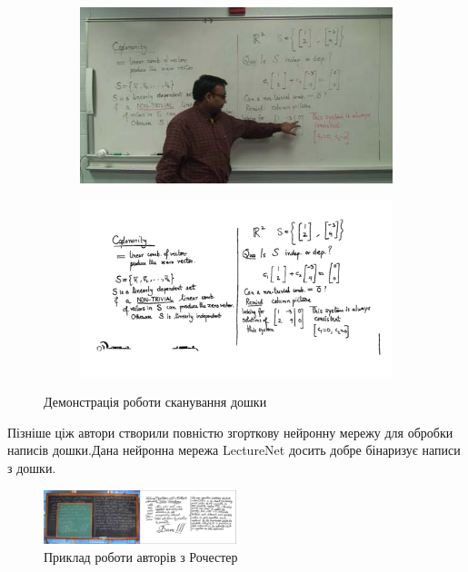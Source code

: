 \begin{figure}[h]
  \centering
  \begin{subfigure}[b]{0.3\textwidth}
    \centering
    \includegraphics[width=\textwidth]{images/davila_2017_1}
  \end{subfigure}
  \begin{subfigure}[b]{0.3\textwidth}
    \centering
    \includegraphics[width=\textwidth]{images/davila_2017_2}
  \end{subfigure}
  \label{fig:davila:2017}
  \caption{Демонстрація роботи сканування дошки}
\end{figure}

Пізніше ціж автори створили повністю згорткову нейронну мережу \cite{davila:2021}
для обробки написів дошки.Дана нейронна мережа LectureNet досить добре бінаризує написи з дошки.

\begin{figure}[h]
  \centering
  \includegraphics[width=0.5\textwidth]{images/davila_2021}
  \caption{Приклад роботи авторів з Рочестер}
  \label{fig:davila:2021}
\end{figure}

\clearpage